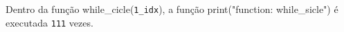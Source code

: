 \documentclass[12pt,varwidth=16cm,border=1pt]{standalone}
\begin{document}
Dentro da função while\_cicle(\verb+1_idx+), a função print("function: while\_sicle") é executada \verb+111+ vezes.

\questiomfalse
\end{document}
